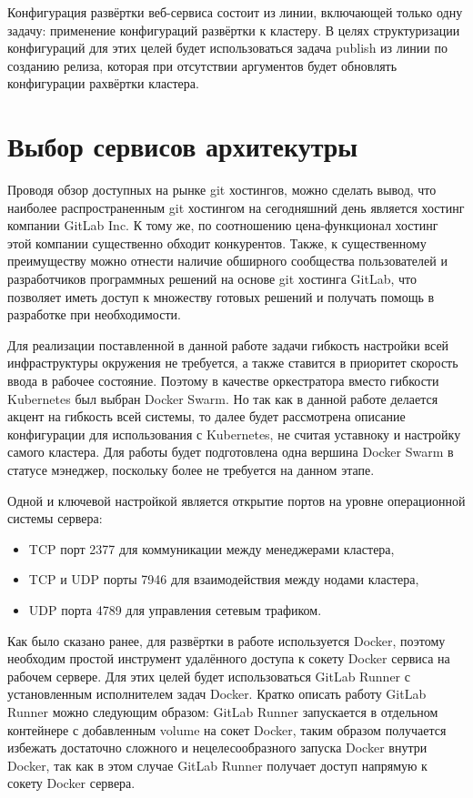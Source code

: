 Конфигурация развёртки веб-сервиса состоит из линии, включающей только одну задачу: применение конфигураций развёртки к кластеру.
В целях структуризации конфигураций для этих целей будет использоваться задача publish из линии по созданию релиза, которая при отсутствии аргументов будет обновлять конфигурации рахвёртки кластера.

\section{Выбор сервисов архитекутры}

Проводя обзор доступных на рынке git хостингов, можно сделать вывод, что наиболее распространенным git хостингом на сегодняшний день является хостинг компании GitLab Inc.
К тому же, по соотношению цена-функционал хостинг этой компании существенно обходит конкурентов.
Также, к существенному преимуществу можно отнести наличие обширного сообщества пользователей и разработчиков программных решений на основе git хостинга GitLab,
что позволяет иметь доступ к множеству готовых решений и получать помощь в разработке при необходимости.

Для реализации поставленной в данной работе задачи гибкость настройки всей инфраструктуры окружения не требуется, а также ставится в приоритет скорость ввода в рабочее состояние.
Поэтому в качестве оркестратора вместо гибкости Kubernetes был выбран Docker Swarm\cite{devOpsPhy}.
Но так как в данной работе делается акцент на гибкость всей системы, то далее будет рассмотрена описание конфигурации для использования с Kubernetes, не считая уставноку и настройку самого кластера.
Для работы будет подготовлена одна вершина Docker Swarm в статусе мэнеджер, поскольку более не требуется на данном этапе.

Одной и ключевой настройкой является открытие портов на уровне операционной системы сервера\cite{web:docker:swarm}:

\begin{itemize}
    \item TCP порт 2377 для коммуникации между менеджерами кластера,
    \item TCP и UDP порты 7946 для взаимодействия между нодами кластера,
    \item UDP порта 4789 для управления сетевым трафиком.
\end{itemize}

Как было сказано ранее, для развёртки в работе используется Docker, поэтому необходим простой инструмент удалённого доступа к сокету Docker сервиса на рабочем сервере.
Для этих целей будет использоваться GitLab Runner с установленным исполнителем задач Docker.
Кратко описать работу GitLab Runner можно следующим образом: GitLab Runner запускается в отдельном контейнере с добавленным volume на сокет Docker,
таким образом получается избежать достаточно сложного и нецелесообразного запуска Docker внутри Docker,
так как в этом случае GitLab Runner получает доступ напрямую к сокету Docker сервера.

